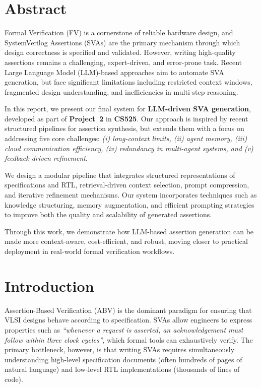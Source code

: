 \documentclass[12pt,a4paper]{article}
\begin{document}
\section{Abstract}

Formal Verification (FV) is a cornerstone of reliable hardware design, and
SystemVerilog Assertions (SVAs) are the primary mechanism through which
design correctness is specified and validated. However, writing high-quality
assertions remains a challenging, expert-driven, and error-prone task.
Recent Large Language Model (LLM)-based approaches aim to automate SVA
generation, but face significant limitations including restricted context
windows, fragmented design understanding, and inefficiencies in multi-step
reasoning.

In this report, we present our final system for \textbf{LLM-driven SVA
generation}, developed as part of \textbf{Project~2} in \textbf{CS525}. Our
approach is inspired by recent structured pipelines for assertion synthesis,
but extends them with a focus on addressing five core challenges: 
\textit{(i) long-context limits, (ii) agent memory, (iii) cloud communication
efficiency, (iv) redundancy in multi-agent systems, and (v) feedback-driven
refinement}. 

We design a modular pipeline that integrates structured representations
of specifications and RTL, retrieval-driven context selection, prompt
compression, and iterative refinement mechanisms. Our system incorporates
techniques such as knowledge structuring, memory augmentation, and efficient
prompting strategies to improve both the quality and scalability of generated
assertions. 

Through this work, we demonstrate how LLM-based assertion generation can be
made more context-aware, cost-efficient, and robust, moving closer to practical
deployment in real-world formal verification workflows.
\section{Introduction}

Assertion-Based Verification (ABV) is the dominant paradigm for ensuring that
VLSI designs behave according to specification. SVAs allow engineers to express
properties such as \textit{``whenever a request is asserted, an acknowledgement
must follow within three clock cycles''}, which formal tools can exhaustively
verify. The primary bottleneck, however, is that writing SVAs requires
simultaneously understanding high-level specification documents (often
hundreds of pages of natural language) and low-level RTL implementations
(thousands of lines of code).
\end{document}
